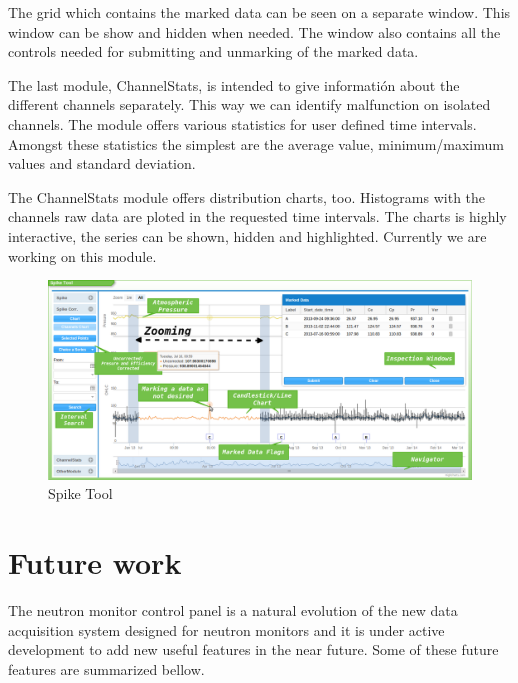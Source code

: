 \documentclass[a4paper]{jpconf}
\begin{document}
The grid which contains the marked data can be seen on a separate window. This window can be show and hidden when needed. The window
also contains all the controls needed for submitting and unmarking of the marked data.

The last module, ChannelStats, is intended to give informatión about the different channels separately. This way we can identify
malfunction on isolated channels. The module offers various statistics for user defined time intervals. Amongst these statistics
the simplest are the average value, minimum/maximum values and standard deviation.

The ChannelStats module offers distribution charts, too. Histograms with the channels raw data are ploted in the requested time
intervals. The charts is highly interactive, the series can be shown, hidden and highlighted. Currently we are working on this
module.

\begin{figure}[h]
    \centering
    \includegraphics[keepaspectratio, width=1\textwidth]{./resources/SpikeTool.png}
    \caption{Spike Tool}
    \label{fig:arch}
\end{figure}

\section{Future work}

The neutron monitor control panel is a natural evolution of the new data
acquisition system designed for neutron monitors and it is under active
development to add new useful features in the near future. Some of these future
features are summarized bellow.
\end{document}
